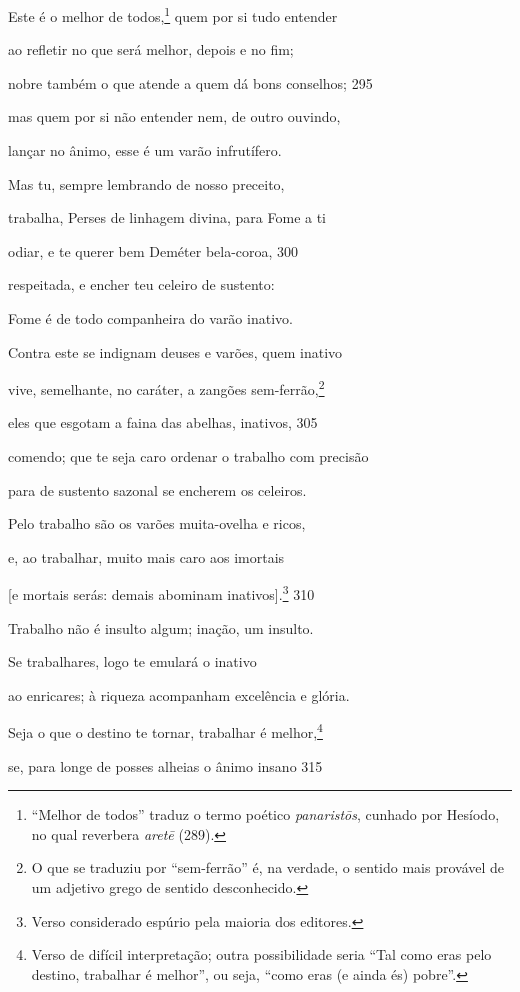 Este é o melhor de todos,\footnote{``Melhor de todos'' traduz o termo poético \emph{panaristōs}, cunhado por Hesíodo, no qual reverbera \emph{aretē} (289).} quem por si tudo entender

ao refletir no que será melhor, depois e no fim;

nobre também o que atende a quem dá bons conselhos; \num{295}

mas quem por si não entender nem, de outro ouvindo,

lançar no ânimo, esse é um varão infrutífero.

Mas tu, sempre lembrando de nosso preceito,

trabalha, Perses de linhagem divina, para Fome a ti

odiar, e te querer bem Deméter bela-coroa, \num{300}

respeitada, e encher teu celeiro de sustento:

Fome é de todo companheira do varão inativo.

Contra este se indignam deuses e varões, quem inativo

vive, semelhante, no caráter, a zangões sem-ferrão,\footnote{O que se traduziu por ``sem-ferrão'' é, na verdade, o sentido mais
provável de um adjetivo grego de sentido desconhecido.}

eles que esgotam a faina das abelhas, inativos, \num{305}

comendo; que te seja caro ordenar o trabalho com precisão

para de sustento sazonal se encherem os celeiros.

Pelo trabalho são os varões muita-ovelha e ricos,

e, ao trabalhar, muito mais caro aos imortais

{[}e mortais serás: demais abominam inativos{]}.\footnote{Verso considerado espúrio pela maioria dos editores.} \num{310}

Trabalho não é insulto algum; inação, um insulto.

Se trabalhares, logo te emulará o inativo

ao enricares; à riqueza acompanham excelência e glória.

Seja o que o destino te tornar, trabalhar é melhor,\footnote{Verso de difícil interpretação; outra possibilidade seria ``Tal
como eras pelo destino, trabalhar é melhor'', ou seja, ``como eras (e
ainda és) pobre''.}

se, para longe de posses alheias o ânimo insano \num{315}

